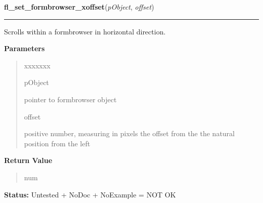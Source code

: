     \label{xformslib:library:fl_set_formbrowser_xoffset}

    \vspace{0.5ex}

\hspace{.8\funcindent}\begin{boxedminipage}{\funcwidth}

    \raggedright \textbf{fl\_set\_formbrowser\_xoffset}(\textit{pObject}, \textit{offset})

    \vspace{-1.5ex}

    \rule{\textwidth}{0.5\fboxrule}
\setlength{\parskip}{2ex}
    Scrolls within a formbrowser in horizontal direction.

\setlength{\parskip}{1ex}
      \textbf{Parameters}
      \vspace{-1ex}

      \begin{quote}
        \begin{Ventry}{xxxxxxx}

          \item[pObject]

          pointer to formbrowser object

          \item[offset]

          positive number, measuring in pixels the offset from the the 
          natural position from the left

        \end{Ventry}

      \end{quote}

      \textbf{Return Value}
    \vspace{-1ex}

      \begin{quote}
      num

      \end{quote}

\textbf{Status:} Untested + NoDoc + NoExample = NOT OK



    \end{boxedminipage}

    \label{xformslib:library:fl_set_formbrowser_yoffset}

